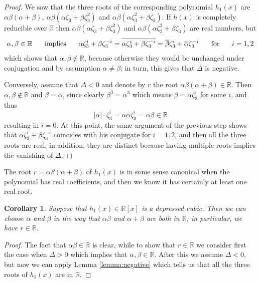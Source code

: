 \documentclass[11pt,a4paper]{article}
\numberwithin{equation}{section}
\newcommand{\R}{\mathbb{R}}
\newtheorem{cor}[teo]{Corollary}
\theoremstyle{definition}
\begin{document}
\begin{proof}
 We saw that the three roots of the corresponding polynomial $h_1(x)$ are $\alpha\beta(\alpha+\beta),\:\alpha\beta(\alpha\zeta_3+\beta\zeta_3^2)$ and $\alpha\beta(\alpha\zeta_3^2+\beta\zeta_3)$.  
 If $h(x)$ is completely reducible over $\R$ then $\alpha\beta(\alpha\zeta_3+\beta\zeta_3^2)$ and $\alpha\beta(\alpha\zeta_3^2+\beta\zeta_3)$ are real numbers, but \[\alpha,\beta\in\R\hspace{0.5cm}\text{ implies }\hspace{0.5cm}\alpha\zeta_3^i+\beta\zeta_3^{-i}=\overline{\alpha\zeta_3^i+\beta\zeta_3^{-i}}=\overline\beta\zeta_3^i+\overline\alpha\zeta_3^{-i}\hspace{0.5cm}\text{ for }\hspace{0.5cm}i=1,2\] which shows that $\alpha,\beta\notin\R$, because otherwise they would be unchanged under conjugation and by assumption $\alpha\neq\beta$; in turn, this gives that $\Delta$ is negative.

 Conversely, assume that $\Delta<0$ and denote by $r$ the root $\alpha\beta(\alpha+\beta)\in\R$. Then $\alpha,\beta\notin\R$ and $\beta=\overline\alpha$, since clearly $\beta^3=\overline\alpha^3$ which means $\beta=\overline\alpha\zeta_3^i$ for some $i$, and thus \[|\alpha|\cdot\zeta_3^i=\alpha\overline\alpha\zeta_3^i=\alpha\beta\in\R\] resulting in $i=0$. At this point, the same argument of the previous step shows that $\alpha\zeta_3^i+\beta\zeta_3^{-i}$ coincides with his conjugate for $i=1,2$, and then all the three roots are real; in addition, they are distinct because having multiple roots implies the vanishing of $\Delta$.
\end{proof}
The root $r=\alpha\beta(\alpha+\beta)$ of $h_1(x)$ is in some sense canonical when the polynomial has real coefficients, and then we know it has certainly at least one real root.
\begin{cor}
 Suppose that $h_1(x)\in\R[x]$ is a depressed cubic. Then we can choose $\alpha$ and $\beta$ in the way that $\alpha\beta$ and $\alpha+\beta$ are both in $\R$; in particular, we have $r\in\R$.  
\end{cor}
\begin{proof}
  The fact that $\alpha\beta\in\R$ is clear, while to show that $r\in\R$ we consider first the case when $\Delta>0$ which implies that $\alpha,\beta\in\R$. After this we assume $\Delta<0$, but now we can apply Lemma \ref{lemma:negative} which tells us that all the three roots of $h_1(x)$ are in $\R$. 
\end{proof}
\end{document}
